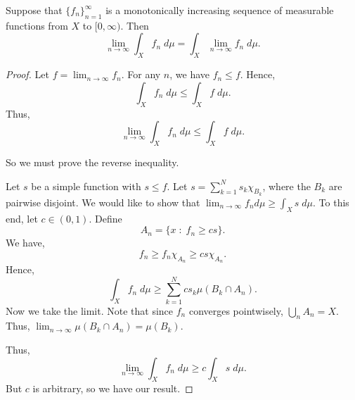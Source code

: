 \documentclass{owmaths}
\begin{document}
\begin{proposition}
    Suppose that $\{f_n\}_{n=1}^\infty$ is a monotonically increasing
    sequence of measurable functions from $X$ to $[0,\infty)$. Then
    \begin{equation*}
        \lim_{n\rightarrow\infty} \int_Xf_n\;d\mu = \int_X \lim_{n\rightarrow\infty} f_n\;d\mu.
    \end{equation*}
\end{proposition} 
\begin{proof}
    Let $f = \lim_{n\rightarrow \infty} f_n$. For any $n$, we have $f_n\leq f$. Hence,
    \begin{equation*}
        \int_{X} f_n\;d\mu \leq \int_X f\;d\mu.
    \end{equation*}
    Thus,
    \begin{equation*}
        \lim_{n\rightarrow\infty} \int_X f_n\;d\mu \leq\int_X f\;d\mu.
    \end{equation*}
    
    So we must prove the reverse inequality.
    
    Let $s$ be a simple function with $s \leq f$.
    Let $s = \sum_{k=1}^N s_k \chi_{B_k}$, where the $B_k$
    are pairwise disjoint.
     We would like to show that
    $\lim_{n\rightarrow\infty} f_nd\mu \geq \int_X s\;d\mu$. To this end,
    let $c \in (0,1)$. Define
    \begin{equation*}
        A_n = \{x\;:\;f_n \geq cs\}.
    \end{equation*}
    We have,
    \begin{equation*}
        f_n \geq f_n \chi_{A_n} \geq cs\chi_{A_n}.
    \end{equation*} 
    Hence,
    \begin{equation*}
        \int_X f_n\;d\mu \geq \sum_{k=1}^N cs_k \mu(B_k \cap A_n).
    \end{equation*}
    Now we take the limit. Note that since $f_n$ converges pointwisely,
    $\bigcup_n A_n = X$. Thus, $\lim_{n\rightarrow\infty} \mu(B_k \cap A_n) = \mu(B_k)$.
    
    Thus, 
    \begin{equation*}
        \lim_{n\rightarrow\infty} \int_X f_n\;d\mu \geq c\int_X s\;d\mu.
    \end{equation*}
    But $c$ is arbitrary, so we have our result.
\end{proof} 
  
\end{document}
